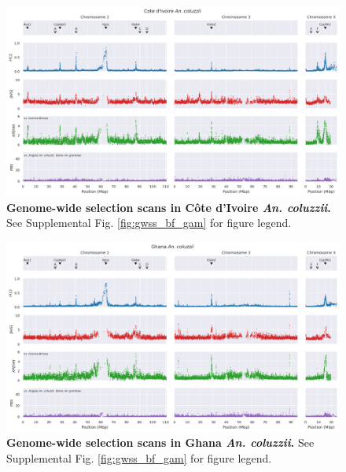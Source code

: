 \documentclass[a4paper,11pt,abstracton,hidelinks]{scrartcl}
\begin{document}
\begin{landscape}
\begin{figure}[t!]
	\begin{center}
		\includegraphics*[width=1.05\linewidth,center]{artwork/gwss_ci_col_gw_ao_col_gq_gam.png}
	\end{center}
	\caption[Genome-wide selection scans in C\^{o}te d'Ivoire \textit{An. coluzzii}]{
	\textbf{Genome-wide selection scans in C\^{o}te d'Ivoire \textit{An. coluzzii}.} 
	See Supplemental Fig. \ref{fig:gwss_bf_gam} for figure legend.
	} 
	\label{fig:gwss_ci_col}
\end{figure}


\begin{figure}[t!]
	\begin{center}
		\includegraphics*[width=1.05\linewidth,center]{artwork/gwss_gh_col_gw_ao_col_gq_gam.png}
	\end{center}
	\caption[Genome-wide selection scans in Ghana \textit{An. coluzzii}]{
	\textbf{Genome-wide selection scans in Ghana \textit{An. coluzzii}.} 
	See Supplemental Fig. \ref{fig:gwss_bf_gam} for figure legend.
	} 
	\label{fig:gwss_gh_col}
\end{figure}



\end{landscape}
\end{document}
